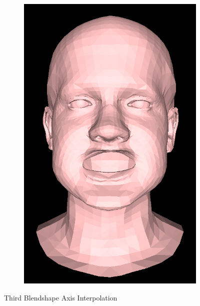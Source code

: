 \begin{figure}[h]
\begin{subfigure}[b]{0.24\textwidth}
        \includegraphics[width=\textwidth]{figures/blendshape_interp/3/00004.png}
    \end{subfigure}
    \caption{Third Blendshape Axis Interpolation }\label{fig:Blendshape_axis_3}
\end{figure}
